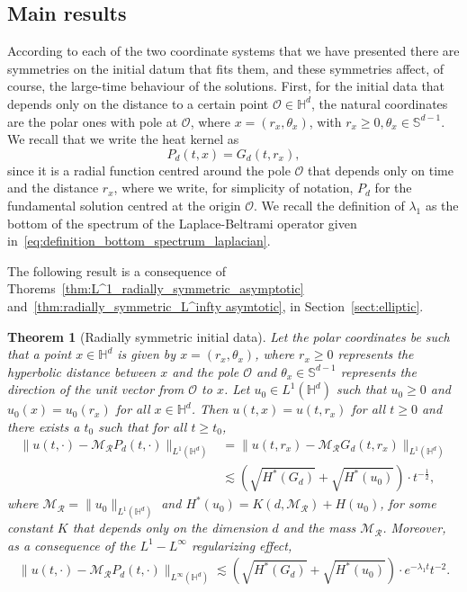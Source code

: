 \documentclass[12pt,longbibliography]{article}
\def\S{\mathbb{S}}
\def\H{\mathbb{H}}
\newtheorem{thm}{Theorem}[section]
\theoremstyle{definition}
\theoremstyle{remark}
\theoremstyle{example}
\begin{document}
\subsection{Main results}


According to each of the two coordinate systems that we have presented there are symmetries on the initial datum that fits them, and these symmetries affect, of course, the large-time behaviour of the solutions. First, for the initial data that depends only on the distance to a certain point $\mathcal{O}\in\H^d$, the natural coordinates are the polar ones with pole at $\mathcal{O}$, where $x=(r_x,\theta_x)$, with $r_x\geq 0, \theta_x\in\S^{d-1}$. We recall that we write the heat kernel as
\[
P_d(t, x) = G_d(t, r_x),
\]
since it is a radial function centred around the pole $\mathcal{O}$ that depends only on time and the distance $r_x$, where we write, for simplicity of notation, $P_d$ for the fundamental solution centred at the origin $\mathcal{O}$. We recall the definition of $\lambda_1$ as the bottom of the spectrum of the Laplace-Beltrami operator given in~\eqref{eq:definition_bottom_spectrum_laplacian}.

The following result is a consequence of Thorems~\ref{thm:L^1_radially_symmetric_asymptotic} and~\ref{thm:radially_symmetric_L^infty asymtotic}, in Section~\ref{sect:elliptic}.
\begin{thm}[Radially symmetric initial data]
	Let the polar coordinates be such that a point $x\in\H^d$ is given by $x=(r_x, \theta_x)$, where $r_x\geq 0$ represents the hyperbolic distance between $x$ and the pole $\mathcal{O}$ and $\theta_x\in\S^{d-1}$ represents the direction of the unit vector from $\mathcal{O}$ to $x$. Let $u_0\in L^1(\H^d)$ such that $u_0\geq 0$ and $u_0(x)=u_0(r_x)$ for all $x\in\H^d$. Then $u(t,x)=u(t, r_x)$ for all $t\geq 0$ and there exists a $t_0$ such that for all $t\geq t_0$,
	\[
	\begin{aligned}
	\| u(t,\cdot) - \mathcal{M}_{\mathcal{R}}P_d(t,\cdot)  \|_{L^1(\mathbb{H}^d)}&=\| u(t,r_x) - \mathcal{M}_{\mathcal{R}}G_d(t,r_x)  \|_{L^1(\mathbb{H}^d)}\\[10pt]
	&\lesssim \left(\sqrt{H^*(G_d)}+\sqrt{H^*(u_0)}\right) \cdot t^{-\frac{1}{2}},
	\end{aligned}
	\]
	where $\mathcal{M}_{\mathcal{R}}=\|u_0\|_{L^1(\H^d)}$ and $H^*(u_0)= K(d, \mathcal{M}_{\mathcal{R}}) + H(u_0)$, for some constant $K$ that depends only on the dimension $d$ and the mass $\mathcal{M}_{\mathcal{R}}$. Moreover, as a consequence of the $L^1-L^\infty$ regularizing effect,
	\[
	\begin{aligned}
		\| u(t,\cdot) - \mathcal{M}_{\mathcal{R}}P_d(t,\cdot)  \|_{L^\infty(\mathbb{H}^d)}\lesssim \left(\sqrt{H^*(G_d)}+\sqrt{H^*(u_0)}\right) \cdot e^{-\lambda_1 t}t^{-2}.
	\end{aligned}
	\]
\end{thm}  
\end{document}
